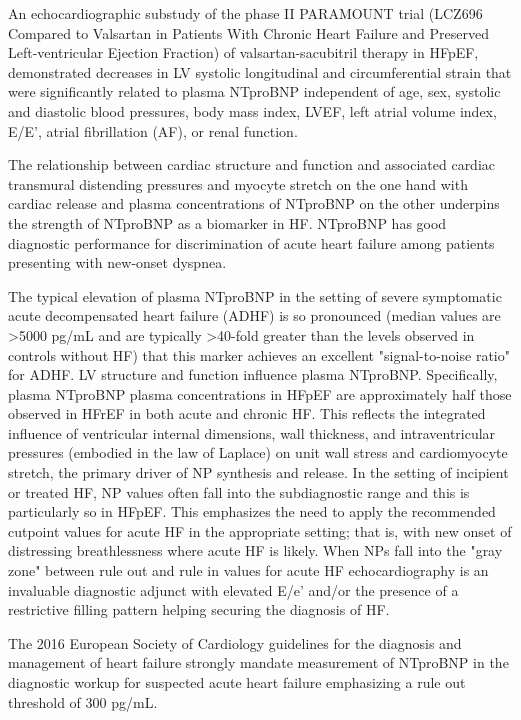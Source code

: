 \documentclass[14pt,a4paper,onecolumn]{extarticle}
\begin{document}
An echocardiographic substudy of the phase II PARAMOUNT trial (LCZ696 Compared to Valsartan in Patients With Chronic Heart Failure and Preserved Left-ventricular Ejection Fraction) of valsartan-sacubitril therapy in HFpEF, demonstrated decreases in LV systolic longitudinal and circumferential strain that were significantly related to plasma NTproBNP independent of age, sex, systolic and diastolic blood pressures, body mass index, LVEF, left atrial volume index, E/E’, atrial fibrillation (AF), or renal function. \citep{Kraigher-Krainer2014}

The relationship between cardiac structure and function and associated cardiac transmural distending pressures and myocyte stretch on the one hand with cardiac release and plasma concentrations of NTproBNP on the other underpins the strength of NTproBNP as a biomarker in HF. NTproBNP has good diagnostic performance for discrimination of acute heart failure among patients presenting with new-onset dyspnea. \citep{Richards2018}

The typical elevation of plasma NTproBNP in the setting of severe symptomatic acute decompensated heart failure (ADHF) is so pronounced (median values are >5000 pg/mL and are typically >40-fold greater than the levels observed in controls without HF) that this marker achieves an excellent "signal-to-noise ratio" for ADHF. LV structure and function influence plasma NTproBNP. Specifically, plasma NTproBNP plasma concentrations in HFpEF are approximately half those observed in HFrEF in both acute and chronic HF. This reflects the integrated influence of ventricular internal dimensions, wall thickness, and intraventricular pressures (embodied in the law of Laplace) on unit wall stress and cardiomyocyte stretch, the primary driver of NP synthesis and release. In the setting of incipient or treated HF, NP values often fall into the subdiagnostic range and this is particularly so in HFpEF. This emphasizes the need to apply the recommended cutpoint values for acute HF in the appropriate setting; that is, with new onset of distressing breathlessness where acute HF is likely. When NPs fall into the "gray zone" between rule out and rule in values for acute HF echocardiography is an invaluable diagnostic adjunct with elevated E/e’ and/or the presence of a restrictive filling pattern helping securing the diagnosis of HF. \citep{Richards2018}

The 2016 European Society of Cardiology guidelines for the diagnosis and management of heart failure strongly mandate measurement of NTproBNP in the diagnostic workup for suspected acute heart failure emphasizing a rule out threshold of 300 pg/mL. \citep{Ponikowski2016}
\end{document}
